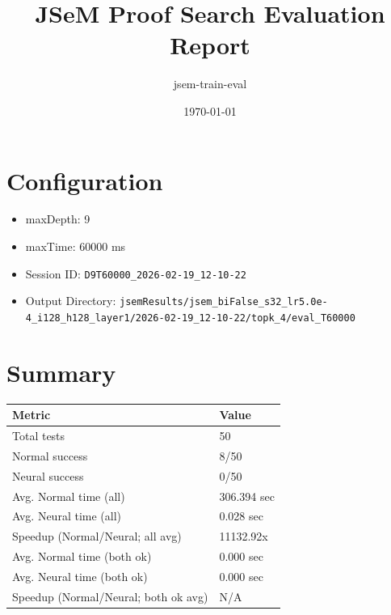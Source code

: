 \documentclass[a4paper,10pt]{article}
\title{JSeM Proof Search Evaluation Report}
\author{jsem-train-eval}
\date{\today}
\begin{document}
\maketitle

\section{Configuration}
\begin{itemize}
\item maxDepth: 9
\item maxTime: 60000 ms
\item Session ID: \texttt{D9T60000\_2026-02-19\_12-10-22}
\item Output Directory: \texttt{jsemResults/jsem\_biFalse\_s32\_lr5.0e-4\_i128\_h128\_layer1/2026-02-19\_12-10-22/topk\_4/eval\_T60000}
\end{itemize}

\section{Summary}
\begin{tabular}{ll}
\toprule
\textbf{Metric} & \textbf{Value} \\
\midrule
Total tests & 50 \\
Normal success & 8/50 \\
Neural success & 0/50 \\
\midrule
Avg. Normal time (all) & 306.394 sec \\
Avg. Neural time (all) & 0.028 sec \\
Speedup (Normal/Neural; all avg) & 11132.92x \\
Avg. Normal time (both ok) & 0.000 sec \\
Avg. Neural time (both ok) & 0.000 sec \\
Speedup (Normal/Neural; both ok avg) & N/A \\
\bottomrule
\end{tabular}
\end{document}
